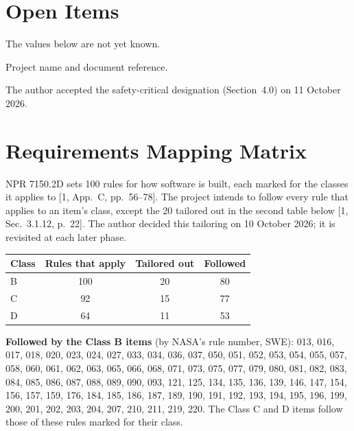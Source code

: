 \documentclass[11pt,a4paper]{article}
\renewcommand{\thesection}{\arabic{section}.0}
\newcommand{\tbditem}[2]{\refstepcounter{tbd}\label{tbd:#1}\item[TBD-\thetbd] #2}
\begin{document}
\appendix
\renewcommand{\thesection}{\Alph{section}}

\section{Open Items}
The values below are not yet known.
\begin{description}
\tbditem{ref}{Project name and document reference.}
\end{description}

\noindent The author accepted the safety-critical designation (Section~4.0) on
11 October 2026.

\clearpage
\section{Requirements Mapping Matrix}
NPR 7150.2D sets 100 rules for how software is built, each marked for the
classes it applies to [1, App.~C, pp.~56--78]. The project intends to follow
every rule that applies to an item's class, except the 20 tailored out in the
second table below [1, Sec.~3.1.12, p.~22]. The author decided this
tailoring on 10 October 2026; it is revisited at each later phase.

\begin{table}[H]
\centering
\begin{tabular}{@{}lccc@{}}
\toprule
Class & Rules that apply & Tailored out & Followed \\
\midrule
B & 100 & 20 & 80 \\
C & 92 & 15 & 77 \\
D & 64 & 11 & 53 \\
\bottomrule
\end{tabular}
\end{table}

\noindent\textbf{Followed by the Class B items} (by NASA's rule number, SWE):
013, 016, 017, 018, 020, 023, 024, 027, 033, 034, 036, 037, 050, 051, 052, 053,
054, 055, 057, 058, 060, 061, 062, 063, 065, 066, 068, 071, 073, 075, 077, 079,
080, 081, 082, 083, 084, 085, 086, 087, 088, 089, 090, 093, 121, 125, 134, 135,
136, 139, 146, 147, 154, 156, 157, 159, 176, 184, 185, 186, 187, 189, 190, 191,
192, 193, 194, 195, 196, 199, 200, 201, 202, 203, 204, 207, 210, 211, 219, 220.
The Class C and D items follow those of these rules marked for their class.
\end{document}
